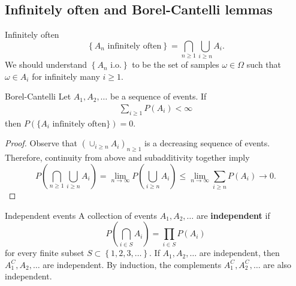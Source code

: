 \subsection{Infinitely often and Borel-Cantelli lemmas}

\begin{defn}{Infinitely often}{}
\[
    \left\{ A_{n} \text{ infinitely often}  \right\} = \bigcap_{n\geq 1} \bigcup_{i\geq n} A_{i}. 
\]
We should understand \( \left\{ A_{n} \text{ i.o.}  \right\}  \) to be the set of samples \( \omega \in \Omega  \) such that \( \omega \in A_{i}  \) for infinitely many \( i\geq 1 \). 
\end{defn}

\begin{lem}{Borel-Cantelli}{}
Let \( A_1, A_2,\dots  \) be a sequence of events. If 
\begin{align*}
    \sum_{i\geq 1} P(A_{i} ) < \infty 
\end{align*}
then \( P(\{A_{i} \text{ infinitely often} \}) = 0.\) 

\tcbline
\begin{proof}
Observe that \( (\cup _{i\geq n}A_{i} )_{n\geq 1} \) is a decreasing sequence of events. Therefore, continuity from above and subadditivity together imply
\[
    P\left( \bigcap _{n\geq 1}\bigcup _{i\geq n} A_{i} \right) = \lim_{n \to \infty} P \left( \bigcup_{i\geq n} A_{i}   \right) \leq \lim_{n \to \infty} \sum_{i\geq n}  P(A_{i} ) \to  0. 
\]
\end{proof}

\end{lem}

\begin{defn}{Independent events}{}
A collection of events \( A_1, A_2, \dots  \) are \textbf{independent} if 
\[
    P \left( \bigcap_{ i \in S} A_{i}  \right)  = \prod_{i \in  S} P(A_{i} ) 
\]
for every finite subset \( S \subset \left\{ 1, 2, 3, \dots  \right\}  \). If \( A_1, A_2, \dots  \) are independent, then \( A_1 ^{C} , A_2, \dots  \)  are independent. By induction, the complements \( A_1 ^{C} , A_2 ^{C} ,\dots  \) are also independent. 
\end{defn}

